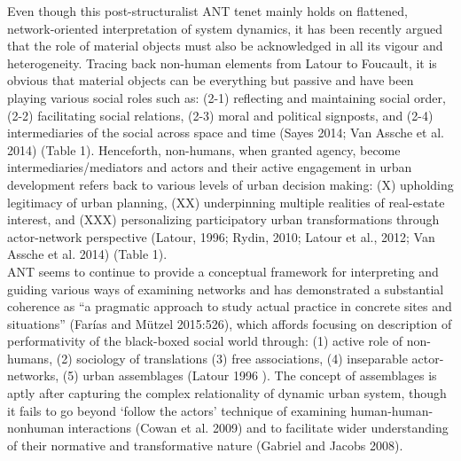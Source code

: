 \documentclass[11pt]{report}
\begin{document}
Even though this post-structuralist ANT tenet mainly holds on flattened, network-oriented interpretation of system dynamics, it has been recently argued that the role of material objects must also be acknowledged in all its vigour and heterogeneity. Tracing back non-human elements from Latour to Foucault, it is obvious that material objects can be everything but passive and have been playing various social roles such as: (2-1) reflecting and maintaining social order, (2-2) facilitating social relations, (2-3) moral and political signposts, and (2-4) intermediaries of the social across space and time (Sayes 2014; Van Assche et al. 2014) (Table 1). Henceforth, non-humans, when granted agency, become intermediaries/mediators and actors and their active engagement in urban development refers back to various levels of urban decision making: (X) upholding legitimacy of urban planning, (XX) underpinning multiple realities of real-estate interest, and (XXX) personalizing participatory urban transformations through actor-network perspective (Latour, 1996; Rydin, 2010; Latour et al., 2012; Van Assche et al. 2014) (Table 1).
\\

ANT seems to continue to provide a conceptual framework for interpreting and guiding various ways of examining networks and has demonstrated a substantial coherence as “a pragmatic approach to study actual practice in concrete sites and situations” (Farías and Mützel 2015:526), which affords focusing on description of performativity of the black-boxed social world through: (1) active role of non-humans, (2) sociology of translations (3) free associations, (4) inseparable actor-networks, (5) urban assemblages (Latour 1996 ). The concept of assemblages is aptly after capturing the complex relationality of dynamic urban system, though it fails to go beyond ‘follow the actors’ technique of examining human-human-nonhuman interactions (Cowan et al. 2009) and to facilitate wider understanding of their normative and transformative nature (Gabriel and Jacobs 2008).
\\
\end{document}
